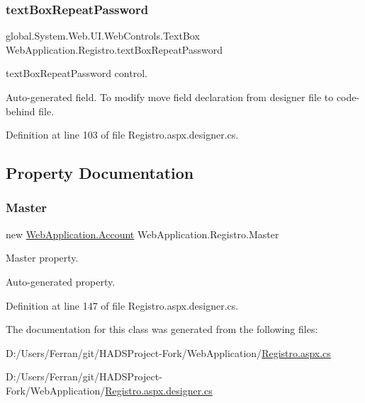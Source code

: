 \subsubsection{\texorpdfstring{textBoxRepeatPassword}{textBoxRepeatPassword}}
{\footnotesize\ttfamily global.\+System.\+Web.\+U\+I.\+Web\+Controls.\+Text\+Box Web\+Application.\+Registro.\+text\+Box\+Repeat\+Password\hspace{0.3cm}{\ttfamily [protected]}}



text\+Box\+Repeat\+Password control. 

Auto-\/generated field. To modify move field declaration from designer file to code-\/behind file. 

Definition at line 103 of file Registro.\+aspx.\+designer.\+cs.



\subsection{Property Documentation}
\mbox{\label{classWebApplication_1_1Registro_a91e9c41ae58c68f45906a1bc3cbeab8e}} 
\subsubsection{\texorpdfstring{Master}{Master}}
{\footnotesize\ttfamily new \mbox{\hyperlink{classWebApplication_1_1Account}{Web\+Application.\+Account}} Web\+Application.\+Registro.\+Master\hspace{0.3cm}{\ttfamily [get]}}



Master property. 

Auto-\/generated property. 

Definition at line 147 of file Registro.\+aspx.\+designer.\+cs.



The documentation for this class was generated from the following files\+:\begin{DoxyCompactItemize}
\item 
D\+:/\+Users/\+Ferran/git/\+H\+A\+D\+S\+Project-\/\+Fork/\+Web\+Application/\mbox{\hyperlink{Registro_8aspx_8cs}{Registro.\+aspx.\+cs}}\item 
D\+:/\+Users/\+Ferran/git/\+H\+A\+D\+S\+Project-\/\+Fork/\+Web\+Application/\mbox{\hyperlink{Registro_8aspx_8designer_8cs}{Registro.\+aspx.\+designer.\+cs}}\end{DoxyCompactItemize}
